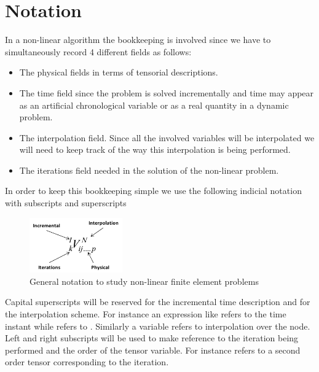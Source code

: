 \section*{Notation}
In a non-linear algorithm the bookkeeping is involved since we have to simultaneously record 4 different fields as follows:
\begin{itemize}
	\item The physical fields in terms of tensorial descriptions.
	\item The time field since the problem is solved incrementally 	and time may appear as an artificial chronological variable 	or as a real quantity in a dynamic problem.
	\item The interpolation field.  Since all the involved variables will be interpolated we will need to keep track of the way this interpolation is being performed.
	\item The iterations field needed in the solution of the non-linear problem.
\end{itemize}
In order to keep this bookkeeping simple we use the following indicial notation with subscripts and superscripts

\begin{figure}[h]
\centering
\includegraphics[width=4cm]{img/figure1_1.pdf}
\caption{General notation to study non-linear finite element problems}
\label{fig:notation}
\end{figure}

Capital superscripts will be reserved for the incremental time description and for the interpolation scheme.  For instance an expression like   refers to the time instant   while   refers to . Similarly a variable   refers to interpolation over the node. Left and right subscripts will be used to make reference to the iteration being performed and the order of the tensor variable.  For instance   refers to a second order tensor corresponding to the iteration.